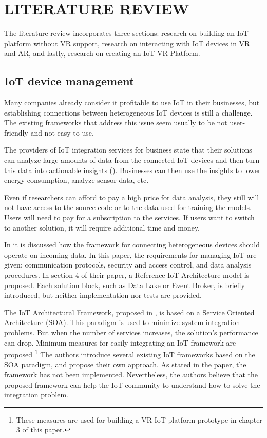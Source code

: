 
\chapter{LITERATURE REVIEW}


The literature review incorporates three sections: research on building an IoT platform without VR support, research on interacting with IoT devices in VR and AR, and lastly, research on creating an IoT-VR Platform.

\section{IoT device management}

Many companies already consider it profitable to use IoT in their businesses, but establishing connections between heterogeneous IoT devices is still a challenge. The existing frameworks that address this issue seem usually to be not user-friendly and not easy to use. 

The providers of IoT integration services for business state that their solutions can analyze large amounts of data from the connected IoT devices and then turn this data into actionable insights (\cite{software_ag_software_2020}). Businesses can then use the insights to lower energy consumption, analyze sensor data, etc.

Even if researchers can afford to pay a high price for data analysis, they still will not have access to the source code or to the data used for training the models. Users will need to pay for a subscription to the services. If users want to switch to another solution, it will require additional time and money.

In \cite{k_mohapatra_solution_2016} it is discussed how the framework for connecting heterogeneous devices should operate on incoming data. In this paper, the requirements for managing IoT are given: communication protocols, security and access control, and data analysis procedures. In section 4 of their paper, a Reference IoT-Architecture model is proposed. Each solution block, such as Data Lake or Event Broker, is briefly introduced, but neither implementation nor tests are provided.

The IoT Architectural Framework, proposed in \cite{uviase_iot_2018}, is based on a Service Oriented Architecture (SOA). This paradigm is used to minimize system integration problems. But when the number of services increases, the solution's performance can drop. Minimum measures for easily integrating an IoT framework are proposed \footnote{These measures are used for building a VR-IoT platform prototype in chapter 3 of this paper.} The authors introduce several existing IoT frameworks based on the SOA paradigm, and propose their own approach. As stated in the paper, the framework has not been implemented.  Nevertheless, the authors believe that the proposed framework can help the IoT community to understand how to solve the integration problem.

